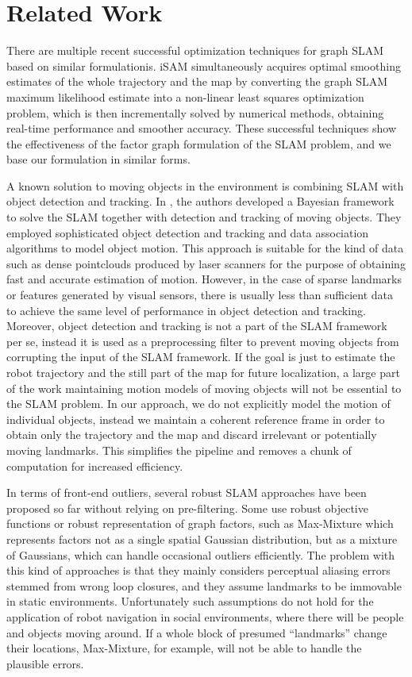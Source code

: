 \section{Related Work}

There are multiple recent successful optimization techniques for graph SLAM
based on similar formulationis. iSAM\cite{isam} simultaneously acquires optimal
smoothing estimates of the whole trajectory and the map by converting the
graph SLAM maximum likelihood estimate into a non-linear least squares
optimization problem, which is then incrementally solved by numerical methods,
obtaining real-time performance and smoother accuracy. These successful
techniques show the effectiveness of the factor graph formulation of the SLAM
problem, and we base our formulation in similar forms.

A known solution to moving objects in the environment is combining SLAM with
object detection and tracking. In \cite{SLAM-DATMO}, the authors developed a
Bayesian framework to solve the SLAM together with detection and tracking of
moving objects. They employed sophisticated object detection and tracking and
data association algorithms to model object motion. This approach is suitable
for the kind of data such as dense pointclouds produced by laser scanners for
the purpose of obtaining fast and accurate estimation of motion. However, in
the case of sparse landmarks or features generated by visual sensors, there is
usually less than sufficient data to achieve the same level of performance in
object detection and tracking.  Moreover, object detection and tracking is not
a part of the SLAM framework per se, instead it is used as a preprocessing
filter to prevent moving objects from corrupting the input of the SLAM
framework. If the goal is just to estimate the robot trajectory and the still
part of the map for future localization, a large part of the work maintaining
motion models of moving objects will not be essential to the SLAM problem. In
our approach, we do not explicitly model the motion of individual objects,
instead we maintain a coherent reference frame in order to obtain only the
trajectory and the map and discard irrelevant or potentially moving landmarks.
This simplifies the pipeline and removes a chunk of computation for increased
efficiency.

In terms of front-end outliers, several robust SLAM approaches have been
proposed so far without relying on pre-filtering. Some use robust objective
functions or robust representation of graph factors, such as
Max-Mixture\cite{mm} which represents factors not as a single spatial
Gaussian distribution, but as a mixture of Gaussians, which can handle
occasional outliers efficiently. The problem with this kind of approaches is
that they mainly considers perceptual aliasing errors stemmed from wrong loop
closures, and they assume landmarks to be immovable in static environments.
Unfortunately such assumptions do not hold for the application of robot
navigation in social environments, where there will be people and objects
moving around. If a whole block of presumed ``landmarks'' change their
locations, Max-Mixture, for example, will not be able to handle the plausible
errors.

